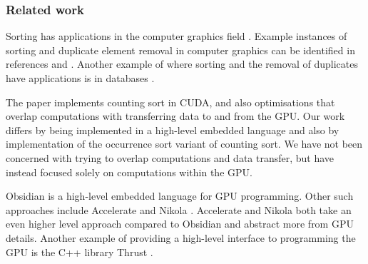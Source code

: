 \subsubsection{Related work} 

Sorting has applications in the computer graphics field . 
Example instances of sorting and duplicate element removal in computer graphics 
can be identified in references  and . Another example 
of where sorting and the removal of duplicates have applications is 
in databases . 


The paper  implements counting sort in CUDA, and also optimisations 
that overlap computations with transferring data to and from the GPU.
Our work differs by being implemented in a high-level embedded
language and also by implementation of the occurrence sort variant of counting sort. We have not been concerned with
trying to overlap computations and data transfer, but have instead
focused solely on computations within the GPU.

Obsidian is a high-level embedded language for GPU
programming. Other such approaches include Accelerate
 and Nikola . Accelerate and Nikola both take an even
higher level approach compared to Obsidian and abstract more from GPU
details. Another example of providing a high-level interface to
programming the GPU is the C++ library Thrust .



